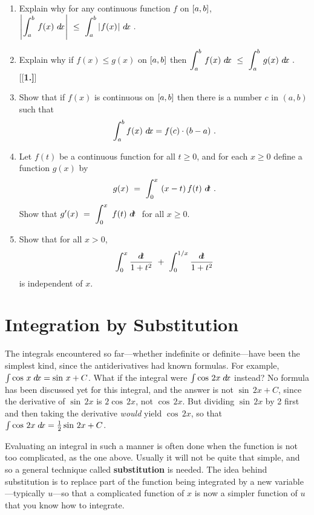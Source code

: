 {\begin{enumerate}[\bfseries 1.]
 \item Explain why for any continuous function $f$ on $\lbrack a,b \rbrack$,
  $\Biggl\lvert\mspace{1mu}\displaystyle\int_a^b\,f(x)~d\!x\mspace{1mu}\Biggr\rvert ~\le~ \displaystyle\int_a^b\,\lvert\mspace{1mu}f(x)\mspace{1mu}\rvert~d\!x ~.$
 \item Explain why if $f(x) \le g(x)$ on $\lbrack a,b \rbrack$ then
 $\displaystyle\int_a^b\,f(x)~d\!x ~\le~ \displaystyle\int_a^b\,g(x)~d\!x ~.$
[{[\bfseries 1.]}]
 \item Show that if $f(x)$ is continuous on $\lbrack a,b \rbrack$ then there is a number
  $c$ in $(a,b)$ such that
\[
\int_a^b f(x)~d\!x = f(c) \cdot (b-a) ~.
\]
 \item Let $f(t)$ be a continuous function for all $t \ge 0$, and for each
  $x \ge 0$ define a function $g(x)$ by
  \[
   g(x) ~=~ \displaystyle\int_0^x ~(x-t)\,f(t)~d\!t ~.
  \]
  Show that $g'(x) ~=~ \displaystyle\int_0^x ~f(t)~d\!t ~$ for all $x \ge 0$.
 \item Show that for all $x > 0$,
\[
\int_0^x \frac{d\!t}{1+t^2} ~+~ \int_0^{1/x} \frac{d\!t}{1+t^2}
\]
is independent of $x$.
\end{enumerate}
}
\newpage
\section{Integration by Substitution}
The integrals encountered so far---whether indefinite or definite---have been
the simplest kind, since the antiderivatives had known formulas. For
example, $\int \cos\,x\;d\!x = \sin\,x + C$. What if the integral were
$\int \cos\,2x\;d\!x$ instead? No formula has been discussed yet for this
integral, and the answer is not $\sin\,2x + C$, since the derivative of
$\sin\,2x$ is $2 \cos\,2x$, not $\cos\,2x$. But dividing $\sin\,2x$ by 2 first
and then taking the derivative \emph{would} yield $\cos\,2x$, so that
$\int \cos\,2x\;d\!x = \frac{1}{2}\sin\,2x + C$.

Evaluating an integral in such a manner is often done when the function is not
too complicated, as the one above. Usually it will not be quite that simple, and
so a general technique called \textbf{substitution}
is needed. The idea behind substitution is to replace part of the function being
integrated by a new variable---typically $u$---so that a complicated function of
$x$ is now a simpler function of $u$ that you know how to integrate.

